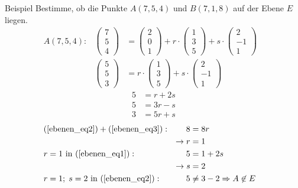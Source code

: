 \documentclass{article}
\begin{document}
\begin{boxx}[DarkBlue]{Beispiel}
    \hspace{6mm} Bestimme, ob die Punkte $A(7,5,4)$ und $B(7,1,8)$ auf der Ebene $E$ liegen.\\
    \begin{align*}
        &&&A(7,5,4):    & \begin{pmatrix}7\\5\\4\end{pmatrix} &= \begin{pmatrix}2\\0\\1\end{pmatrix} + r \cdot \begin{pmatrix}1\\3\\5\end{pmatrix} + s \cdot \begin{pmatrix}2\\-1\\1\end{pmatrix} &&&&\\
        &&&&\begin{pmatrix}5\\5\\3\end{pmatrix} &= r \cdot \begin{pmatrix}1\\3\\5\end{pmatrix} + s \cdot \begin{pmatrix}2\\-1\\1\end{pmatrix}
    \end{align*}
    \begin{align}
        5 &= r + 2s \label{ebenen_eq1}\\
        5 &= 3r - s \label{ebenen_eq2}\\
        3 &= 5r + s \label{ebenen_eq3}
    \end{align}
    \begin{align*}
        &&&&&&&\text{(\ref{ebenen_eq2})} + \text{(\ref{ebenen_eq3})}:& 8 &= 8r &&&&&&&&\\
        &&&&&&&& \rightarrow r &= 1 \\
        &&&&&&& r = 1 \text{ in (\ref{ebenen_eq1})}:& 5 &= 1 + 2s \\
        &&&&&&&& \rightarrow s &= 2 \\
        &&&&&&& r = 1;\; s = 2\text{ in (\ref{ebenen_eq2})}:& 5 &\not= 3 - 2 \Rightarrow A \not\in E
    \end{align*}


\end{boxx}
\end{document}
